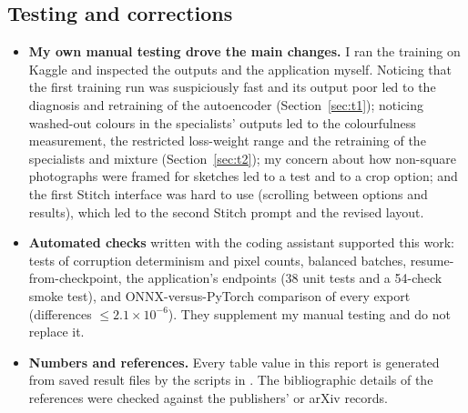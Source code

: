 \subsection{Testing and corrections}
\begin{itemize}
\item \textbf{My own manual testing drove the main changes.} I ran the training on Kaggle and inspected the outputs and the application myself. Noticing that the first training run was suspiciously fast and its output poor led to the diagnosis and retraining of the autoencoder (Section~\ref{sec:t1}); noticing washed-out colours in the specialists' outputs led to the colourfulness measurement, the restricted loss-weight range and the retraining of the specialists and mixture (Section~\ref{sec:t2}); my concern about how non-square photographs were framed for sketches led to a test and to a crop option; and the first Stitch interface was hard to use (scrolling between options and results), which led to the second Stitch prompt and the revised layout.
\item \textbf{Automated checks} written with the coding assistant supported this work: tests of corruption determinism and pixel counts, balanced batches, resume-from-checkpoint, the application's endpoints (38 unit tests and a 54-check smoke test), and ONNX-versus-PyTorch comparison of every export (differences $\le2.1\times10^{-6}$). They supplement my manual testing and do not replace it.
\item \textbf{Numbers and references.} Every table value in this report is generated from saved result files by the scripts in . The bibliographic details of the references were checked against the publishers' or arXiv records.
\end{itemize}
